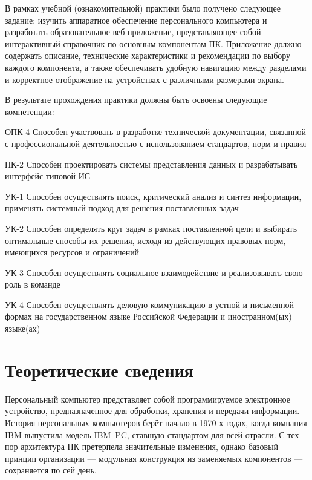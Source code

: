 \documentclass[14pt,a4paper]{extarticle}
\begin{document}
В рамках учебной (ознакомительной) практики было получено следующее задание: изучить аппаратное обеспечение персонального компьютера и разработать образовательное веб-приложение, представляющее собой интерактивный справочник по основным компонентам ПК. Приложение должно содержать описание, технические характеристики и рекомендации по выбору каждого компонента, а также обеспечивать удобную навигацию между разделами и корректное отображение на устройствах с различными размерами экрана.

В результате прохождения практики должны быть освоены следующие компетенции:

ОПК-4 Способен
участвовать в
разработке
технической
документации,
связанной с
профессиональной
деятельностью с
использованием
стандартов, норм
и правил

ПК-2 Способен
проектировать
системы
представления
данных и
разрабатывать
интерфейс
типовой ИС

УК-1 Способен
осуществлять
поиск,
критический
анализ и синтез
информации,
применять
системный подход
для решения
поставленных
задач

УК-2 Способен
определять круг
задач в рамках
поставленной
цели и выбирать
оптимальные
способы их
решения, исходя
из действующих
правовых норм,
имеющихся
ресурсов и
ограничений

УК-3 Способен
осуществлять
социальное
взаимодействие и
реализовывать
свою роль в
команде

УК-4 Способен
осуществлять
деловую
коммуникацию в
устной и
письменной
формах на
государственном
языке Российской
Федерации и
иностранном(ых)
языке(ах)


\newpage
\section{Теоретические сведения}

Персональный компьютер представляет собой программируемое электронное устройство, предназначенное для обработки, хранения и передачи информации. История персональных компьютеров берёт начало в 1970-х годах, когда компания IBM выпустила модель IBM~PC, ставшую стандартом для всей отрасли. С тех пор архитектура ПК претерпела значительные изменения, однако базовый принцип организации --- модульная конструкция из заменяемых компонентов --- сохраняется по сей день.
\end{document}
